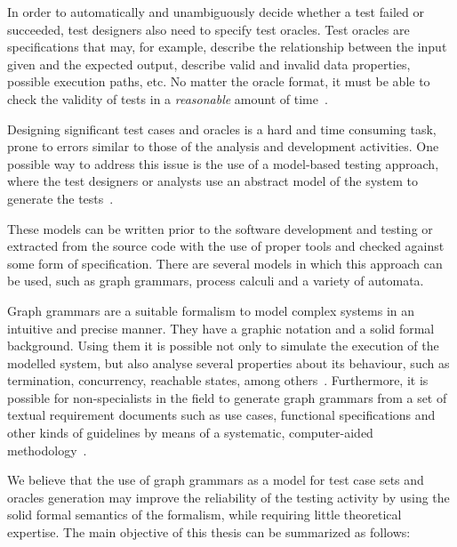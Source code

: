 In order to automatically and unambiguously decide whether a test failed or succeeded, test designers also need to specify test oracles. Test oracles are specifications that may, for example, describe the relationship between the input given and the expected output, describe valid and invalid data properties, possible execution paths, etc. No matter the oracle format, it must be able to check the validity of tests in a \textit{reasonable} amount of time~\cite{Weyuker1982}.

Designing significant test cases and oracles is a hard and time consuming task, prone to errors similar to those of the analysis and development activities. One possible way to address this issue is the use of a model-based testing approach, where the test designers or analysts use an abstract model of the system to generate the tests~\cite{Utting2006}. 

These models can be written prior to the software development and testing or extracted from the source code with the use of proper tools and checked against some form of specification. There are several models in which this approach can be used, such as graph grammars, process calculi and a variety of automata.

Graph grammars are a suitable formalism to model complex systems in an intuitive and precise manner. They have a graphic notation and a solid formal background.  Using them it is possible not only to simulate the execution of the modelled system, but also analyse several properties about its behaviour, such as termination, concurrency, reachable states, among others~\cite{Ehrig2006}. Furthermore, it is possible for non-specialists in the field to generate graph grammars from a set of textual requirement documents such as use cases, functional specifications and other kinds of guidelines by means of a systematic, computer-aided methodology~\cite{Junior2015,BezerraWEIT2016,Cota2017}.

We believe that the use of graph grammars as a model for test case sets and oracles generation may improve the reliability of the testing activity by using the solid formal semantics of the formalism, while requiring little theoretical expertise. The main objective of this thesis can be summarized as follows:

\begin{intuition}
\end{intuition}\hfill\break

